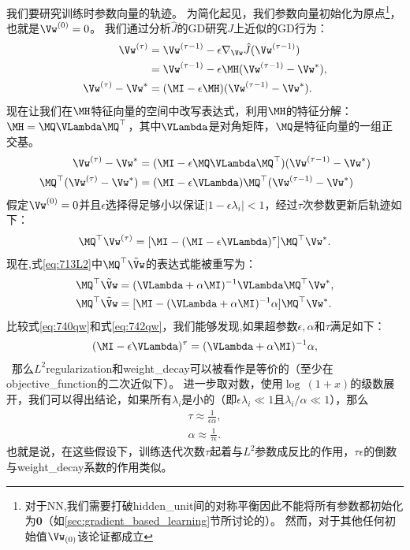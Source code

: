 我们要研究训练时参数向量的轨迹。
为简化起见，我们参数向量初始化为原点\footnote{对于\gls{NN},我们需要打破\gls{hidden_unit}间的对称平衡因此不能将所有参数都初始化为$\mathbf{0}$（如\ref{sec:gradient_based_learning}节所讨论的）。
然而，对于其他任何初始值$\Vw_{(0)}$该论证都成立}，也就是$\Vw^{(0)} = 0$。
我们通过分析$\hat{J}$的\gls{GD}研究$J$上近似的\gls{GD}行为：
\begin{align}
\Vw^{(\tau)} &= \Vw^{(\tau-1)} -\epsilon \nabla_{\Vw} \hat{J}( \Vw^{(\tau-1)} ) \\
&=  \Vw^{(\tau-1)}  - \epsilon  \MH ( \Vw^{(\tau-1)} -  \Vw^* ), \\
\Vw^{(\tau)}  -  \Vw^* &= (\MI - \epsilon  \MH) ( \Vw^{(\tau-1)} -  \Vw^* ).
 \end{align}
现在让我们在$\MH$特征向量的空间中改写表达式，利用$\MH$的特征分解：$\MH = \MQ \VLambda \MQ^\top$，其中$\VLambda$是对角矩阵，$\MQ$是特征向量的一组正交基。
\begin{align}
\Vw^{(\tau)}  -  \Vw^* &= (\MI - \epsilon \MQ \VLambda \MQ^\top) ( \Vw^{(\tau-1)} -  \Vw^* ) \\
\MQ^\top (\Vw^{(\tau)}  -  \Vw^*) &= (\MI - \epsilon \VLambda)\MQ^\top ( \Vw^{(\tau-1)} -  \Vw^* )
\end{align}
假定$\Vw^{(0)} = 0$并且$\epsilon$选择得足够小以保证$|1 - \epsilon \lambda_i |<1$，经过$\tau$次参数更新后轨迹如下：
\begin{align} \label{eq:740qw}
\MQ^\top  \Vw^{(\tau)} = [\MI - (\MI - \epsilon \VLambda)^\tau] \MQ^\top  \Vw^* .
\end{align}
现在,式\ref{eq:713L2}中$\MQ^\top \tilde \Vw$的表达式能被重写为：
\begin{align}
\MQ^\top  \tilde \Vw &= (\VLambda + \alpha \MI)^{-1} \VLambda \MQ^\top  \Vw^*, \\
\MQ^\top  \tilde \Vw &= [\MI - (\VLambda + \alpha \MI)^{-1} \alpha] \MQ^\top  \Vw^*. 
\label{eq:742qw}
\end{align}
比较式\ref{eq:740qw}和式\ref{eq:742qw}，我们能够发现,如果超参数$\epsilon, \alpha$和$\tau$满足如下：
\begin{align}
(\MI - \epsilon \VLambda)^\tau =  (\VLambda + \alpha \MI)^{-1} \alpha,
\end{align}\
那么$L^2$\gls{regularization}和\gls{weight_decay}可以被看作是等价的（至少在\gls{objective_function}的二次近似下）。
进一步取对数，使用$\log~(1+x)$的级数展开，我们可以得出结论，如果所有$\lambda_i$是小的（即$\epsilon \lambda_i \ll 1$且$\lambda_i / \alpha \ll 1$），那么
\begin{align}
\tau \approx \frac{1}{\epsilon \alpha}, \\
\alpha \approx \frac{1}{\tau \epsilon}.
\end{align}
也就是说，在这些假设下，训练迭代次数$\tau$起着与$L^2$参数成反比的作用，$\tau \epsilon$的倒数与\gls{weight_decay}系数的作用类似。

